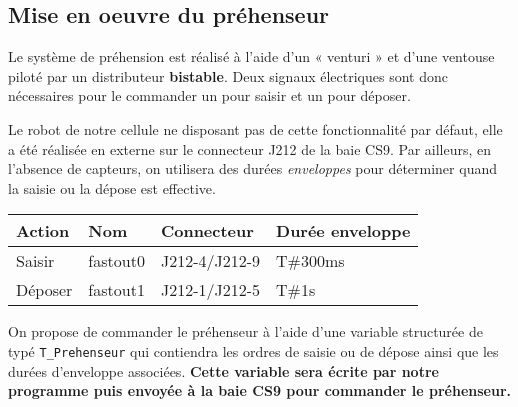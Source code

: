 \subsection{Mise en oeuvre du préhenseur}


Le système de préhension est réalisé à l'aide d'un « venturi » et d'une ventouse piloté par un distributeur \textbf{bistable}. Deux signaux électriques sont donc nécessaires pour le commander un pour saisir et un pour déposer.

Le robot de notre cellule ne disposant pas de cette fonctionnalité par défaut, elle a été réalisée en externe sur le connecteur J212 de la baie CS9. Par ailleurs, en l'absence de capteurs, on utilisera des durées \textit{enveloppes} pour déterminer quand la saisie ou la dépose est effective.
\begin{center}
    \begin{tabular}[h]{|l|l|l|l|}
        \hline
        Action & Nom & Connecteur & Durée enveloppe \\
        \hline
        Saisir & fastout0 & J212-4/J212-9 & T\#300ms \\
        Déposer & fastout1 & J212-1/J212-5 & T\#1s \\
        \hline 
    \end{tabular}
\end{center}

On propose de commander le préhenseur à l'aide d'une variable structurée de typé \texttt{T\_Prehenseur} qui contiendra les ordres de saisie ou de dépose ainsi que les durées d'enveloppe associées. 
\textbf{Cette variable sera écrite par notre programme puis envoyée à la baie CS9 pour commander le préhenseur.}

\begin{UPSTIManipulation}
    \vspace{3cm}
\end{UPSTIManipulation}

